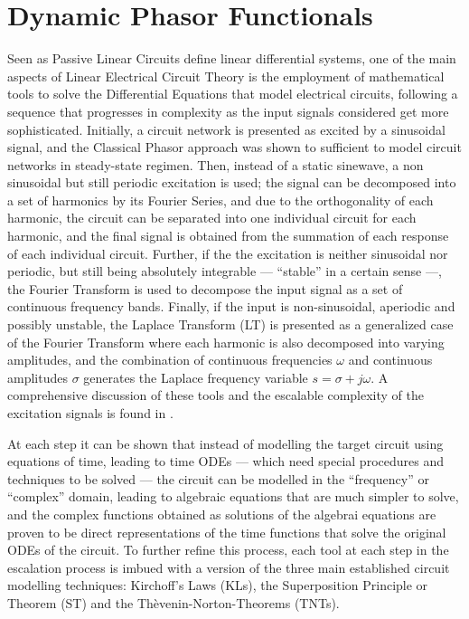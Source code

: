 \chapter{Dynamic Phasor Functionals}\label{chapter:dpos}

	Seen as Passive Linear Circuits define linear differential systems, one of the main aspects of Linear Electrical Circuit Theory is the employment of mathematical tools to solve the Differential Equations that model electrical circuits, following a sequence that progresses in complexity as the input signals considered get more sophisticated. Initially, a circuit network is presented as excited by a sinusoidal signal, and the Classical Phasor approach was shown to sufficient to model circuit networks in steady-state regimen. Then, instead of a static sinewave, a non sinusoidal but still periodic excitation is used; the signal can be decomposed into a set of harmonics by its Fourier Series, and due to the orthogonality of each harmonic, the circuit can be separated into one individual circuit for each harmonic, and the final signal is obtained from the summation of each response of each individual circuit. Further, if the the excitation is neither sinusoidal nor periodic, but still being absolutely integrable — ``stable'' in a certain sense —, the Fourier Transform is used to decompose the input signal as a set of continuous frequency bands. Finally, if the input is non-sinusoidal, aperiodic and possibly unstable, the Laplace Transform (LT) is presented as a generalized case of the Fourier Transform where each harmonic is also decomposed into varying amplitudes, and the combination of continuous frequencies $\omega$ and continuous amplitudes $\sigma$ generates the Laplace frequency variable $s = \sigma + j\omega$. A comprehensive discussion of these tools and the escalable complexity of the excitation signals is found in \cite{scottElementsLinearCircuits1965,desoerBasicCircuitTheory1987}.

	At each step it can be shown that instead of modelling the target circuit using equations of time, leading to time ODEs — which need special procedures and techniques to be solved — the circuit can be modelled in the ``frequency'' or ``complex'' domain, leading to algebraic equations that are much simpler to solve, and the complex functions obtained as solutions of the algebrai equations are proven to be direct representations of the time functions that solve the original ODEs of the circuit. To further refine this process, each tool at each step in the escalation process is imbued with a version of the three main established circuit modelling techniques: Kirchoff's Laws (KLs), the Superposition Principle or Theorem (ST) and the Thèvenin-Norton-Theorems (TNTs).


